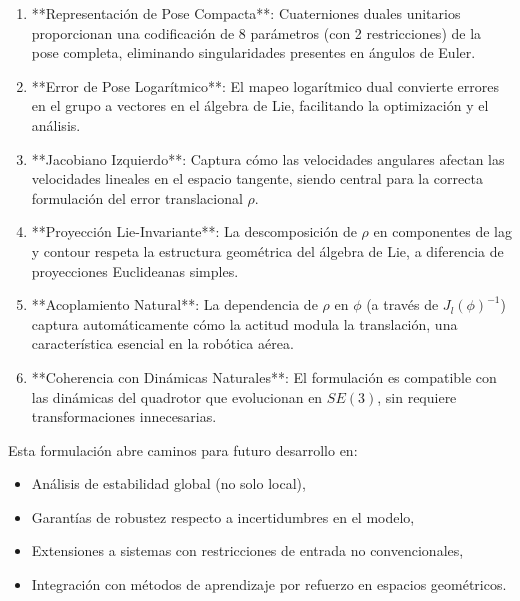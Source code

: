 \documentclass[11pt,a4paper]{article}
\begin{document}
\begin{enumerate}
    \item **Representación de Pose Compacta**: Cuaterniones duales unitarios proporcionan una codificación de 8 parámetros (con 2 restricciones) de la pose completa, eliminando singularidades presentes en ángulos de Euler.
    
    \item **Error de Pose Logarítmico**: El mapeo logarítmico dual convierte errores en el grupo a vectores en el álgebra de Lie, facilitando la optimización y el análisis.
    
    \item **Jacobiano Izquierdo**: Captura cómo las velocidades angulares afectan las velocidades lineales en el espacio tangente, siendo central para la correcta formulación del error translacional $\rho$.
    
    \item **Proyección Lie-Invariante**: La descomposición de $\rho$ en componentes de lag y contour respeta la estructura geométrica del álgebra de Lie, a diferencia de proyecciones Euclideanas simples.
    
    \item **Acoplamiento Natural**: La dependencia de $\rho$ en $\phi$ (a través de $J_l(\phi)^{-1}$) captura automáticamente cómo la actitud modula la translación, una característica esencial en la robótica aérea.
    
    \item **Coherencia con Dinámicas Naturales**: El formulación es compatible con las dinámicas del quadrotor que evolucionan en $SE(3)$, sin requiere transformaciones innecesarias.
\end{enumerate}

Esta formulación abre caminos para futuro desarrollo en:
\begin{itemize}
    \item Análisis de estabilidad global (no solo local),
    \item Garantías de robustez respecto a incertidumbres en el modelo,
    \item Extensiones a sistemas con restricciones de entrada no convencionales,
    \item Integración con métodos de aprendizaje por refuerzo en espacios geométricos.
\end{itemize}
\end{document}
